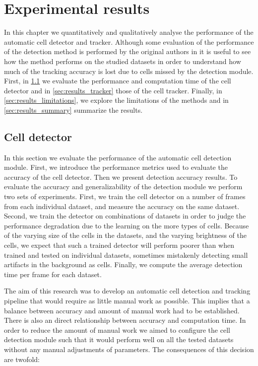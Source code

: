 \chapter{Experimental results}
\label{chap:results}

In this chapter we quantitatively and qualitatively analyse the performance of the automatic cell detector and tracker. Although some evaluation of the performance of the detection method is performed by the original authors in \cite{arteta12} it is useful to see how the method performs on the studied datasets in order to understand how much of the tracking accuracy is lost due to cells missed by the detection module. First, in \cref{sec:results_detector} we evaluate the performance and computation time of the cell detector and in \cref{sec:results_tracker} those of the cell tracker. Finally, in \cref{sec:results_limitations}, we explore the limitations of the methods and in \cref{sec:results_summary} summarize the results.

\section{Cell detector}
	\label{sec:results_detector}
	
	In this section we evaluate the performance of the automatic cell detection module. First, we introduce the performance metrics used to evaluate the accuracy of the cell detector. Then we present detection accuracy results. To evaluate the accuracy and generalizability of the detection module we perform two sets of experiments. First, we train the cell detector on a number of frames from each individual dataset, and measure the accuracy on the same dataset. Second, we train the detector on combinations of datasets in order to judge the performance degradation due to the learning on the more types of cells. Because of the varying size of the cells in the datasets, and the varying brightness of the cells, we expect that such a trained detector will perform poorer than when trained and tested on individual datasets, sometimes mistakenly detecting small artifacts in the background as cells. Finally, we compute the average detection time per frame for each dataset.
	
	The aim of this research was to develop an automatic cell detection and tracking pipeline that would require as little manual work as possible. This implies that a balance between accuracy and amount of manual work had to be established. There is also an direct relationship between accuracy and computation time. In order to reduce the amount of manual work we aimed to configure the cell detection module such that it would perform well on all the tested datasets without any manual adjustments of parameters. The consequences of this decision are twofold:
	
